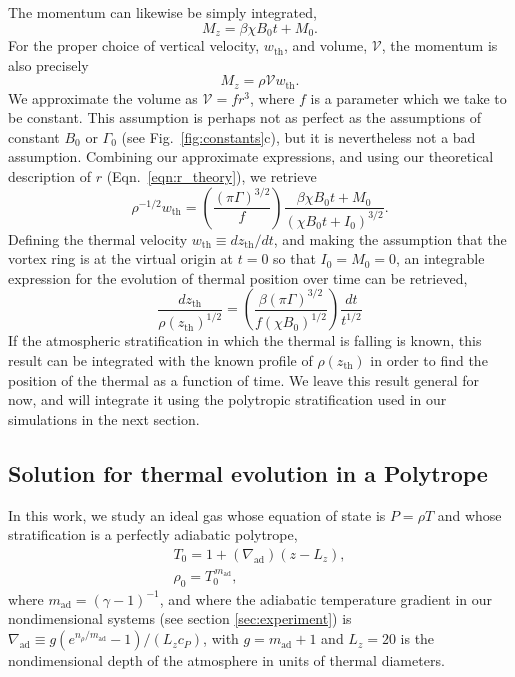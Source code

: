 \documentclass[twocolumn, amsmath, amsfonts, amssymb, trackchanges]{aastex62}
\newcommand{\grad}{\ensuremath{\nabla}}
\begin{document}
The momentum can likewise be simply integrated,
\begin{equation*}
M_z = \beta\chi B_0 t + M_0.
\end{equation*}
For the proper choice of vertical velocity, $w_{\text{th}}$, and volume, $\mathcal{V}$, the momentum is also precisely 
\begin{equation*}
M_z = \rho \mathcal{V} w_{\text{th}}.
\end{equation*}
We approximate the volume as $\mathcal{V} = f r^3$, where $f$ is a parameter which we take to be constant. 
This assumption is perhaps not as perfect as the assumptions of constant $B_0$ or $\Gamma_0$ (see Fig.~\ref{fig:constants}c), but it is nevertheless not a bad assumption. 
Combining our approximate expressions, and using our theoretical description of $r$ (Eqn.~\ref{eqn:r_theory}), we retrieve
\begin{equation}
\rho^{-1/2} w_{\text{th}} = \left(\frac{(\pi \Gamma)^{3/2}}{f}\right)\frac{\beta\chi B_0 t + M_0}{(\chi B_0 t + I_0)^{3/2}}.
\end{equation}
Defining the thermal velocity $w_{\text{th}} \equiv dz_{\text{th}}/dt$, and making the assumption that the vortex ring is at the virtual origin at $t = 0$ so that $I_0 = M_0 = 0$, an integrable expression for the evolution of thermal position over time can be retrieved,
\begin{equation}
\frac{dz_{\text{th}}}{\rho(z_{\text{th}})^{1/2}} =
\left(\frac{\beta(\pi\Gamma)^{3/2}}{f(\chi B_0)^{1/2}}\right)\frac{dt}{t^{1/2}}
\label{eqn:dz_theory}
\end{equation}
If the atmospheric stratification in which the thermal is falling is known, this result can be integrated with the known profile of $\rho(z_{\text{th}})$ in order to find the position of the thermal as a function of time. 
We leave this result general for now, and will integrate it using the polytropic stratification used in our simulations in the next section.

\subsection{Solution for thermal evolution in a Polytrope}
In this work, we study an ideal gas whose equation of state is $P = \rho T$ and whose stratification is a perfectly adiabatic polytrope,
\begin{gather}
T_0 = 1 + (\grad_{\text{ad}})(z - L_z), \\
\rho_0 = T_0^{\,m_{\text{ad}}},
\label{eqn:polytrope}
\end{gather}
where $m_{\text{ad}} = (\gamma-1)^{-1}$, and where the adiabatic temperature gradient in our nondimensional systems (see section \ref{sec:experiment}) is $\grad_{\text{ad}} \equiv g(e^{n_\rho/m_{\text{ad}}} - 1)/(L_z c_P)$, with $g = m_{\text{ad}} + 1$ and $L_z = 20$ is the nondimensional depth of the atmosphere in units of thermal diameters.
 
\end{document}
